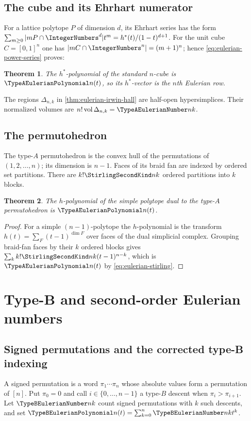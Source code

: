 \documentclass[11pt,a4paper,oneside,openany]{book}
\newtheorem{theorem}{Theorem}[chapter]
\theoremstyle{definition}
\theoremstyle{remark}
\begin{document}
\section{The cube and its Ehrhart numerator}
For a lattice polytope $P$ of dimension $d$, its Ehrhart series has the form
$\sum_{m\ge0}|mP\cap\IntegerNumbers^d|t^m=h^*(t)/(1-t)^{d+1}$.
For the unit cube $C=[0,1]^n$ one has $|mC\cap\IntegerNumbers^n|=(m+1)^n$; hence
\eqref{eq:eulerian-power-series} proves:
\begin{theorem}
The $h^*$-polynomial of the standard $n$-cube is $\TypeAEulerianPolynomial n(t)$, so its $h^*$-vector is
the $n$th Eulerian row.
\end{theorem}

The regions $\Delta_{n,k}$ in \cref{thm:eulerian-irwin-hall} are half-open
hypersimplices.  Their normalized volumes are $n!\operatorname{vol}\Delta_{n,k}
=\TypeAEulerianNumber nk$.

\section{The permutohedron}
The type-$A$ permutohedron is the convex hull of the permutations of
$(1,2,\ldots,n)$; its dimension is $n-1$.  Faces of its braid fan are indexed by
ordered set partitions.  There are $k!\StirlingSecondKind nk$ ordered partitions into $k$
blocks.

\begin{theorem}
The $h$-polynomial of the simple polytope dual to the type-$A$ permutohedron is
$\TypeAEulerianPolynomial n(t)$.
\end{theorem}
\begin{proof}
For a simple $(n-1)$-polytope the $h$-polynomial is the transform
$h(t)=\sum_F(t-1)^{\dim F}$ over faces of the dual simplicial complex.  Grouping
braid-fan faces by their $k$ ordered blocks gives
$\sum_k k!\StirlingSecondKind nk(t-1)^{n-k}$, which is $\TypeAEulerianPolynomial n(t)$ by
\eqref{eq:eulerian-stirling}.
\end{proof}

\chapter{Type-B and second-order Eulerian numbers}

\section{Signed permutations and the corrected type-B indexing}
A signed permutation is a word $\pi_1\cdots\pi_n$ whose absolute values form a
permutation of $[n]$.  Put $\pi_0=0$ and call
$i\in\{0,\ldots,n-1\}$ a type-$B$ descent when $\pi_i>\pi_{i+1}$.
Let $\TypeBEulerianNumber nk$ count signed permutations with $k$ such descents, and set
$\TypeBEulerianPolynomial n(t)=\sum_{k=0}^{n}\TypeBEulerianNumber nk t^k$.
\end{document}
